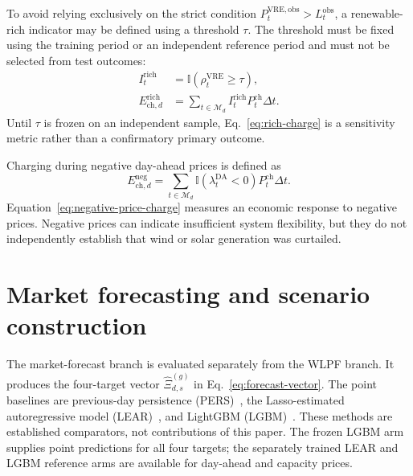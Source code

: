 \documentclass[11pt,a4paper]{article}
\begin{document}
To avoid relying exclusively on the strict condition $P^{\mathrm{VRE,obs}}_t>L^{\mathrm{obs}}_t$, a renewable-rich indicator may be defined using a threshold $\tau$. The threshold must be fixed using the training period or an independent reference period and must not be selected from test outcomes:
\begin{align}
  I^{\mathrm{rich}}_t
  &=\mathbb{I}\!\left(\rho^{\mathrm{VRE}}_t\geq\tau\right),
  \label{eq:rich-indicator}\\
  E^{\mathrm{rich}}_{\mathrm{ch},d}
  &=\sum_{t\in\mathcal{M}_d}
  I^{\mathrm{rich}}_tP^{\mathrm{ch}}_t\Delta t.
  \label{eq:rich-charge}
\end{align}
Until $\tau$ is frozen on an independent sample, Eq.~\eqref{eq:rich-charge} is a sensitivity metric rather than a confirmatory primary outcome.

Charging during negative day-ahead prices is defined as
\begin{equation}
  E^{\mathrm{neg}}_{\mathrm{ch},d}
  =\sum_{t\in\mathcal{M}_d}
  \mathbb{I}\!\left(\lambda^{\mathrm{DA}}_t<0\right)
  P^{\mathrm{ch}}_t\Delta t.
  \label{eq:negative-price-charge}
\end{equation}
Equation~\eqref{eq:negative-price-charge} measures an economic response to negative prices. Negative prices can indicate insufficient system flexibility, but they do not independently establish that wind or solar generation was curtailed.

\section{Market forecasting and scenario construction}
\label{sec:market-forecast-method}

The market-forecast branch is evaluated separately from the WLPF branch.  It
produces the four-target vector
$\widehat\Xi^{(g)}_{d,s}$ in Eq.~\eqref{eq:forecast-vector}.  The point
baselines are previous-day persistence (PERS)~\cite{murphy1992}, the Lasso-estimated
autoregressive model (LEAR)~\cite{zielweron2018}, and LightGBM
(LGBM)~\cite{ke2017lightgbm}.  These methods are established comparators, not
contributions of this paper.  The frozen LGBM arm supplies point predictions
for all four targets; the separately trained LEAR and LGBM reference arms are
available for day-ahead and capacity prices.
\end{document}
